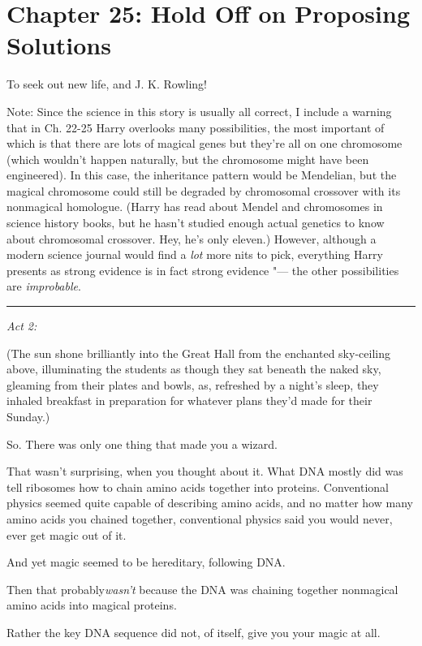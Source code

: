\chapter{Chapter 25: Hold Off on Proposing Solutions}
To seek out new life, and J. K. Rowling!

Note: Since the science in this story is usually all correct, I include
a warning that in Ch. 22-25 Harry overlooks many possibilities, the most
important of which is that there are lots of magical genes but they're
all on one chromosome (which wouldn't happen naturally, but the
chromosome might have been engineered). In this case, the inheritance
pattern would be Mendelian, but the magical chromosome could still be
degraded by chromosomal crossover with its nonmagical homologue. (Harry
has read about Mendel and chromosomes in science history books, but he
hasn't studied enough actual genetics to know about chromosomal
crossover. Hey, he's only eleven.) However, although a modern science
journal would find a \emph{lot} more nits to pick, everything Harry
presents as strong evidence is in fact strong evidence "--- the other
possibilities are \emph{improbable}.

\begin{center}\rule{3in}{0.4pt}\end{center}

\emph{Act 2:}

(The sun shone brilliantly into the Great Hall from the enchanted
sky-ceiling above, illuminating the students as though they sat beneath
the naked sky, gleaming from their plates and bowls, as, refreshed by a
night's sleep, they inhaled breakfast in preparation for whatever plans
they'd made for their Sunday.)

So. There was only one thing that made you a wizard.

That wasn't surprising, when you thought about it. What DNA mostly did
was tell ribosomes how to chain amino acids together into proteins.
Conventional physics seemed quite capable of describing amino acids, and
no matter how many amino acids you chained together, conventional
physics said you would never, ever get magic out of it.

And yet magic seemed to be hereditary, following DNA.

Then that probably\emph{wasn't} because the DNA was chaining together
nonmagical amino acids into magical proteins.

Rather the key DNA sequence did not, of itself, give you your magic at
all.

